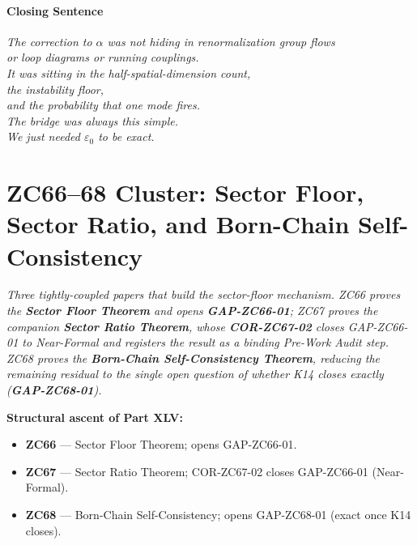 \documentclass[12pt, a4paper]{article}
\begin{document}
\subsection{Closing Sentence}

\bigskip
\begin{center}
\textit{The correction to $\alpha$ was not hiding in renormalization group flows\\
or loop diagrams or running couplings.\\
It was sitting in the half-spatial-dimension count,\\
the instability floor,\\
and the probability that one mode fires.\\
The bridge was always this simple.\\
We just needed $\varepsilon_0$ to be exact.}
\end{center}




\part{ZC66--68 Cluster: Sector Floor, Sector Ratio, and Born-Chain Self-Consistency}
\label{part:zc66-68}

\noindent
\textit{Three tightly-coupled papers that build the sector-floor mechanism.
ZC66 proves the \textbf{Sector Floor Theorem} and opens
\textbf{GAP-ZC66-01}; ZC67 proves the companion \textbf{Sector
Ratio Theorem}, whose \textbf{COR-ZC67-02} closes GAP-ZC66-01 to
Near-Formal and registers the result as a binding Pre-Work Audit
step. ZC68 proves the \textbf{Born-Chain Self-Consistency Theorem},
reducing the remaining residual to the single open question of
whether K14 closes exactly (\textbf{GAP-ZC68-01}).}

\medskip
\textbf{Structural ascent of Part XLV:}
\begin{itemize}[leftmargin=1.5em]
\item \textbf{ZC66} --- Sector Floor Theorem; opens GAP-ZC66-01.
\item \textbf{ZC67} --- Sector Ratio Theorem; COR-ZC67-02 closes GAP-ZC66-01 (Near-Formal).
\item \textbf{ZC68} --- Born-Chain Self-Consistency; opens GAP-ZC68-01 (exact once K14 closes).
\end{itemize}
\end{document}
